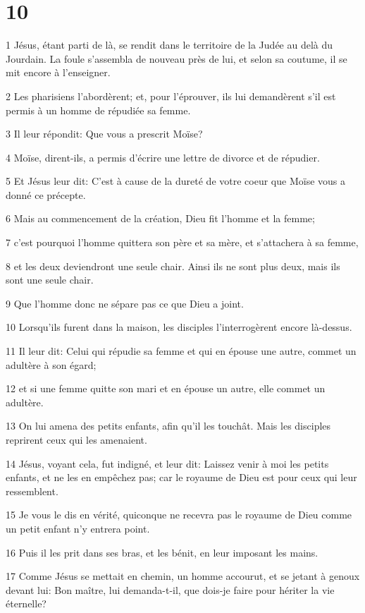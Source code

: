 \chapter{10}

\par 1 Jésus, étant parti de là, se rendit dans le territoire de la Judée au delà du Jourdain. La foule s'assembla de nouveau près de lui, et selon sa coutume, il se mit encore à l'enseigner.
\par 2 Les pharisiens l'abordèrent; et, pour l'éprouver, ils lui demandèrent s'il est permis à un homme de répudiée sa femme.
\par 3 Il leur répondit: Que vous a prescrit Moïse?
\par 4 Moïse, dirent-ils, a permis d'écrire une lettre de divorce et de répudier.
\par 5 Et Jésus leur dit: C'est à cause de la dureté de votre coeur que Moïse vous a donné ce précepte.
\par 6 Mais au commencement de la création, Dieu fit l'homme et la femme;
\par 7 c'est pourquoi l'homme quittera son père et sa mère, et s'attachera à sa femme,
\par 8 et les deux deviendront une seule chair. Ainsi ils ne sont plus deux, mais ils sont une seule chair.
\par 9 Que l'homme donc ne sépare pas ce que Dieu a joint.
\par 10 Lorsqu'ils furent dans la maison, les disciples l'interrogèrent encore là-dessus.
\par 11 Il leur dit: Celui qui répudie sa femme et qui en épouse une autre, commet un adultère à son égard;
\par 12 et si une femme quitte son mari et en épouse un autre, elle commet un adultère.
\par 13 On lui amena des petits enfants, afin qu'il les touchât. Mais les disciples reprirent ceux qui les amenaient.
\par 14 Jésus, voyant cela, fut indigné, et leur dit: Laissez venir à moi les petits enfants, et ne les en empêchez pas; car le royaume de Dieu est pour ceux qui leur ressemblent.
\par 15 Je vous le dis en vérité, quiconque ne recevra pas le royaume de Dieu comme un petit enfant n'y entrera point.
\par 16 Puis il les prit dans ses bras, et les bénit, en leur imposant les mains.
\par 17 Comme Jésus se mettait en chemin, un homme accourut, et se jetant à genoux devant lui: Bon maître, lui demanda-t-il, que dois-je faire pour hériter la vie éternelle?
